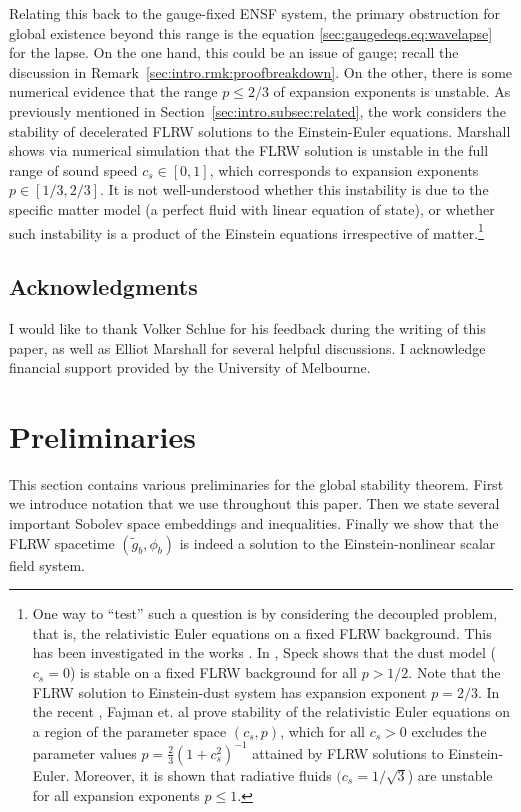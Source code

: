 \documentclass{article}
\newcommand{\wt}{\widetilde}
\begin{document}
Relating this back to the gauge-fixed ENSF system, the primary obstruction for global existence beyond this range is the equation \eqref{sec:gaugedeqs.eq:wavelapse} for the lapse. On the one hand, this could be an issue of gauge; recall the discussion in Remark~\ref{sec:intro.rmk:proofbreakdown}. On the other, there is some numerical evidence that the range $p \leq 2/3$ of expansion exponents is unstable. As previously mentioned in Section~\ref{sec:intro.subsec:related}, the work \cite{Mar:instabilityFLRW:25} considers the stability of decelerated FLRW solutions to the Einstein-Euler equations. Marshall shows via numerical simulation that the FLRW solution is unstable in the full range of sound speed $c_s \in [0,1]$, which corresponds to expansion exponents $p \in [1/3,2/3]$. It is not well-understood whether this instability is due to the specific matter model (a perfect fluid with linear equation of state), or whether such instability is a product of the Einstein equations irrespective of matter.\footnote{One way to ``test'' such a question is by considering the decoupled problem, that is, the relativistic Euler equations on a fixed FLRW background. This has been investigated in the works \cite{Spe:relEulerstab:13,Fajetal:decelEulerstab:25}. In \cite{Spe:relEulerstab:13}, Speck shows that the dust model ($c_s = 0$) is stable on a fixed FLRW background for all $p > 1/2$. Note that the FLRW solution to Einstein-dust system has expansion exponent $p = 2/3$. In the recent \cite{Fajetal:decelEulerstab:25}, Fajman et. al prove stability of the relativistic Euler equations on a region of the parameter space $(c_s,p)$, which for all $c_s > 0$ excludes the parameter values $p = \frac{2}{3}(1+c_s^2)^{-1}$ attained by FLRW solutions to Einstein-Euler. Moreover, it is shown that radiative fluids $(c_s = 1/\sqrt{3}$) are unstable for all expansion exponents $p \leq 1$.}
\subsection{Acknowledgments}
I would like to thank Volker Schlue for his feedback during the writing of this paper, as well as Elliot Marshall for several helpful discussions. I acknowledge financial support provided by the University of Melbourne.\newpage
\section{Preliminaries}\label{prelims}
This section contains various preliminaries for the global stability theorem. First we introduce notation that we use throughout this paper. Then we state several important Sobolev space embeddings and inequalities. Finally we show that the FLRW spacetime $(\wt{g}_b,\phi_b)$ is indeed a solution to the Einstein-nonlinear scalar field system.
\end{document}
